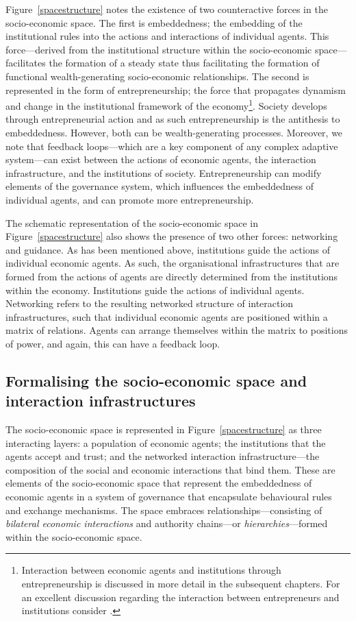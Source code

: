 Figure~\ref{spacestructure} notes the existence of two counteractive forces in the socio-economic space. The first is embeddedness; the embedding of the institutional rules into the actions and interactions of individual agents. This force---derived from the institutional structure within the socio-economic space---facilitates the formation of a steady state thus facilitating the formation of functional wealth-generating socio-economic relationships. The second is represented in the form of entrepreneurship; the force that propagates dynamism and change in the institutional framework of the economy\footnote{Interaction between economic agents and institutions through entrepreneurship is discussed in more detail in the subsequent chapters. For an excellent discussion regarding the interaction between entrepreneurs and institutions consider \citet{HenreksonSanandaji2011}.}. Society develops through entrepreneurial action and as such entrepreneurship is the antithesis to embeddedness. However, both can be wealth-generating processes. Moreover, we note that feedback loops---which are a key component of any complex adaptive system---can exist between the actions of economic agents, the interaction infrastructure, and the institutions of society. Entrepreneurship can modify elements of the governance system, which influences the embeddedness of individual agents, and can promote more entrepreneurship.

The schematic representation of the socio-economic space in Figure~\ref{spacestructure} also shows the presence of two other forces: networking and guidance. As has been mentioned above, institutions guide the actions of individual economic agents. As such, the organisational infrastructures that are formed from the actions of agents are directly determined from the institutions within the economy. Institutions guide the actions of individual agents. Networking refers to the resulting networked structure of interaction infrastructures, such that individual economic agents are positioned within a matrix of relations. Agents can arrange themselves within the matrix to positions of power, and again, this can have a feedback loop.

\subsection{Formalising the socio-economic space and interaction infrastructures}

The socio-economic space is represented in Figure~\ref{spacestructure} as three interacting layers: a population of economic agents; the institutions that the agents accept and trust; and the networked interaction infrastructure---the composition of the social and economic interactions that bind them. These are elements of the socio-economic space that represent the embeddedness of economic agents in a system of governance that encapsulate behavioural rules and exchange mechanisms. The space embraces relationships---consisting of \emph{bilateral economic interactions} and authority chains---or \emph{hierarchies}---formed within the socio-economic space.

